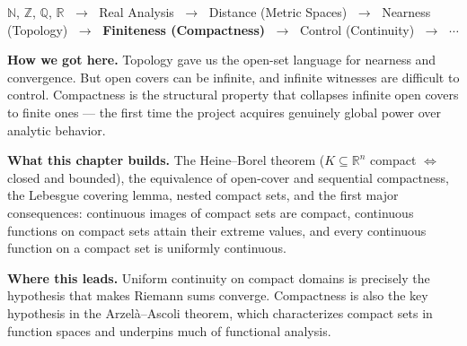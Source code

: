 
\begin{tcolorbox}[
  colback=gray!6,
  colframe=gray!40,
  arc=2pt,
  left=8pt, right=8pt, top=6pt, bottom=6pt,
  title={\small\textbf{Where You Are in the Journey}},
  fonttitle=\small\bfseries
]
\begin{center}
\small
$\mathbb{N}$, $\mathbb{Z}$, $\mathbb{Q}$, $\mathbb{R}$
$\;\to\;$ Real Analysis
$\;\to\;$ Distance (Metric Spaces)
$\;\to\;$ Nearness (Topology)
$\;\to\;$ \textbf{Finiteness (Compactness)}
$\;\to\;$ Control (Continuity)
$\;\to\;$ $\cdots$
\end{center}

\medskip
\noindent\textbf{How we got here.}
Topology gave us the open-set language for nearness and convergence.
But open covers can be infinite, and infinite witnesses are difficult
to control.
Compactness is the structural property that collapses infinite open
covers to finite ones --- the first time the project acquires
genuinely global power over analytic behavior.

\medskip
\noindent\textbf{What this chapter builds.}
The Heine--Borel theorem ($K \subseteq \mathbb{R}^n$ compact
$\Leftrightarrow$ closed and bounded), the equivalence of
open-cover and sequential compactness, the Lebesgue covering lemma,
nested compact sets, and the first major consequences:
continuous images of compact sets are compact,
continuous functions on compact sets attain their extreme values,
and every continuous function on a compact set is uniformly continuous.

\medskip
\noindent\textbf{Where this leads.}
Uniform continuity on compact domains is precisely the hypothesis
that makes Riemann sums converge.
Compactness is also the key hypothesis in the Arzel\`{a}--Ascoli theorem,
which characterizes compact sets in function spaces and underpins
much of functional analysis.
\end{tcolorbox}
\vspace{1em}

